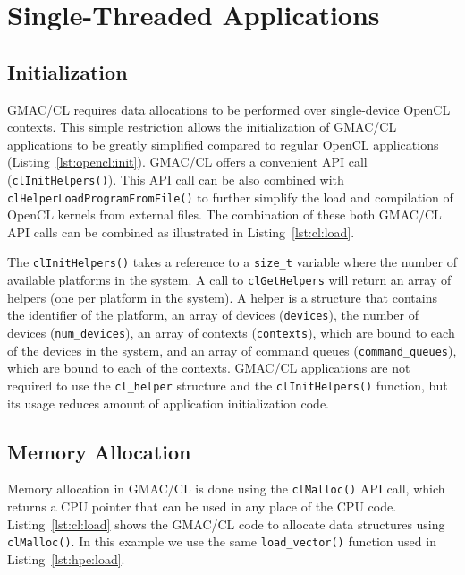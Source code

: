 \section{Single\hyp{}Threaded Applications}

\subsection{Initialization}
GMAC\slash CL requires data allocations to be performed over single\hyp{}device OpenCL contexts.  
This simple restriction allows the initialization of GMAC\slash CL applications to be greatly 
simplified compared to regular OpenCL applications (Listing~\ref{lst:opencl:init}). GMAC\slash CL 
offers a convenient API call (\texttt{clInitHelpers()}). This API call can be also combined with 
\texttt{clHelperLoadProgramFromFile()} to further simplify the load and compilation of OpenCL 
kernels from external files. The combination of these both GMAC\slash CL API calls can be combined 
as illustrated in Listing~\ref{lst:cl:load}.



The \texttt{clInitHelpers()} takes a reference to a \texttt{size\_t} variable where the number of 
available platforms in the system. A call to \texttt{clGetHelpers} will return an array of helpers 
(one per platform in the system). A helper is a structure that contains the identifier of the 
platform, an array of devices (\texttt{devices}), the number of devices (\texttt{num\_devices}), an 
array of contexts (\texttt{contexts}), which are bound to each of the devices in the system, and an 
array of command queues (\texttt{command\_queues}), which are bound to each of the contexts.  
GMAC\slash CL applications are not required to use the \texttt{cl\_helper} structure and the 
\texttt{clInitHelpers()} function, but its usage reduces amount of application initialization code.

\subsection{Memory Allocation}
Memory allocation in GMAC\slash CL is done using the \texttt{clMalloc()} API call, which returns a 
CPU pointer that can be used in any place of the CPU code. Listing~\ref{lst:cl:load} shows the 
GMAC\slash CL code to allocate data structures using \texttt{clMalloc()}. In this example we use 
the same \texttt{load\_vector()} function used in Listing~\ref{lst:hpe:load}.

